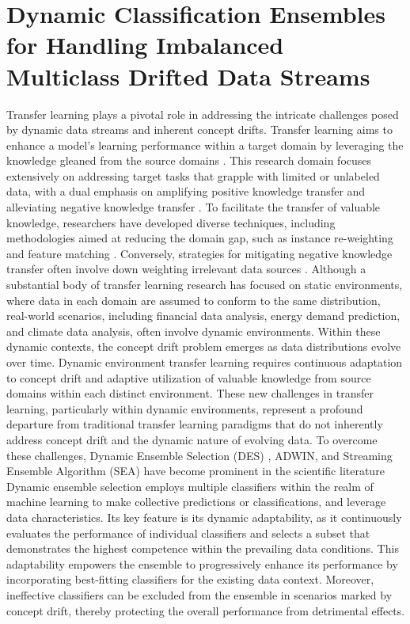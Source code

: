 \chapter{Dynamic Classification Ensembles for Handling Imbalanced
Multiclass Drifted Data Streams}
\label{chapter:6_transfer_learning}

Transfer learning plays a pivotal role in addressing the intricate challenges posed by dynamic data streams and inherent concept drifts. Transfer learning aims to enhance a model's learning performance within a target domain by leveraging the knowledge gleaned from the source domains \cite{pan2009survey, wang2019characterizing}. This research domain focuses extensively on addressing target tasks that grapple with limited or unlabeled data, with a dual emphasis on amplifying positive knowledge transfer and alleviating negative knowledge transfer \cite{wang2019characterizing}. To facilitate the transfer of valuable knowledge, researchers have developed diverse techniques, including methodologies aimed at reducing the domain gap, such as instance re-weighting \cite{zadrozny2004learning, cortes2008sample, pan2010domain} and feature matching \cite{sun2016return, pan2010domain}. Conversely, strategies for mitigating negative knowledge transfer often involve down weighting irrelevant data sources \cite{wang2019characterizing}.
Although a substantial body of transfer learning research has focused on static environments, where data in each domain are assumed to conform to the same distribution, real-world scenarios, including financial data analysis, energy demand prediction, and climate data analysis, often involve dynamic environments. Within these dynamic contexts, the concept drift problem \cite{li2015learning, cao2019learning} emerges as data distributions evolve over time. Dynamic environment transfer learning requires continuous adaptation to concept drift and adaptive utilization of valuable knowledge from source domains within each distinct environment. These new challenges in transfer learning, particularly within dynamic environments, represent a profound departure from traditional transfer learning paradigms that do not inherently address concept drift and the dynamic nature of evolving data.
To overcome these challenges, Dynamic Ensemble Selection (DES) \cite{cruz2017meta, jackowski2014improved, kuncheva2000clustering}, ADWIN, and Streaming Ensemble Algorithm (SEA) have become prominent in the scientific literature \cite{gama2004learning, adams2023explainable, madkour2023historical} Dynamic ensemble selection employs multiple classifiers within the realm of machine learning to make collective predictions or classifications, and leverage data characteristics. Its key feature is its dynamic adaptability, as it continuously evaluates the performance of individual classifiers and selects a subset that demonstrates the highest competence within the prevailing data conditions. This adaptability empowers the ensemble to progressively enhance its performance by incorporating best-fitting classifiers for the existing data context. Moreover, ineffective classifiers can be excluded from the ensemble in scenarios marked by concept drift, thereby protecting the overall performance from detrimental effects.
